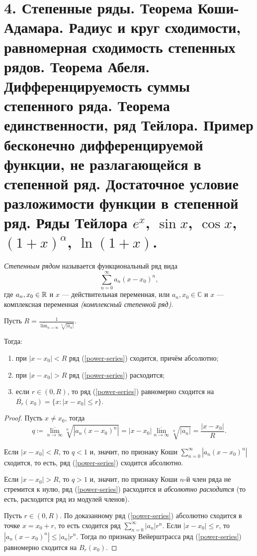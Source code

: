 \section{4. Степенные ряды. Теорема Коши-Адамара. Радиус и круг сходимости, равномерная сходимость степенных рядов. Теорема Абеля. Дифференцируемость суммы степенного ряда. Теорема единственности, ряд Тейлора. Пример бесконечно дифференцируемой функции, не разлагающейся в степенной ряд. Достаточное условие разложимости функции в степенной ряд. Ряды Тейлора $e^{x}$, $\sin x$, $\cos x$, $(1 + x)^{\alpha}$, $\ln(1 + x)$.}

\begin{definition}
    \emph{Степенным рядом} называется функциональный ряд вида
    \begin{equation}
        \label{power-series}
        \sum_{n = 0}^\infty a_n (x - x_0)^n,
    \end{equation}
    где $a_n, x_0 \in \mathbb{R}$ и $x$ --- действительная переменная, или $a_n, x_0 \in \mathbb{C}$ и $x$ --- комплексная переменная \emph{(комплексный степенной ряд)}.
\end{definition}


\begin{theorem}
    \label{cauchy-hadamard}
    Пусть $R = \frac{1}{\overline{\lim}_{n \rightarrow \infty} \sqrt[n]{|a_n|}}$.

    Тогда:
    \begin{enumerate}
        \item при $|x - x_0| < R$ ряд (\ref{power-series}) сходится, причём абсолютно;
        \item при $|x - x_0| > R$ ряд (\ref{power-series}) расходится;
        \item если $r \in (0, R)$, то ряд (\ref{power-series}) равномерно сходится на $\overline{B_r}(x_0) = \{x: |x - x_0| \le r\}$.
    \end{enumerate}

    \begin{proof}
        Пусть $x \neq x_0$, тогда
        \[
            q \coloneqq \overline{\lim_{n \rightarrow \infty}} \sqrt[n]{|a_n (x - x_0)^n|} = |x - x_0| \overline{\lim_{n \rightarrow \infty}} \sqrt[n]{|a_n|} = \frac{|x - x_0|}{R}.
        \]

        Если $|x - x_0| < R$, то $q < 1$ и, значит, по признаку Коши $\sum_{n = 0}^\infty |a_n (x - x_0)^n|$ сходится, то есть, ряд (\ref{power-series}) сходится абсолютно.

        Если $|x - x_0| > R$, то $q > 1$ и, значит, по признаку Коши $n$-й член ряда не стремится к нулю, ряд (\ref{power-series}) расходится и \emph{абсолютно расходится} (то есть, расходится ряд из модулей членов).

        Пусть $r \in (0, R)$. По доказанному ряд (\ref{power-series}) абсолютно сходится в точке $x = x_0 + r$, то есть сходится ряд $\sum_{n = 0}^\infty |a_n|r^n$. Если $|x - x_0| \le r$, то $|a_n (x - x_0)^n| \le |a_n| r^n$. Тогда по признаку Вейерштрасса ряд (\ref{power-series}) равномерно сходится на $B_r(x_0)$.
    \end{proof}
\end{theorem}

